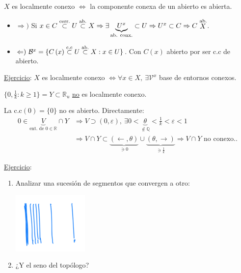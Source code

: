 \begin{prop}
$X$ es localmente conexo $\Leftrightarrow$ la componente conexa de un abierto es abierta.
\end{prop}
\begin{demo}
\begin{itemize}
    \item $\Rightarrow)$ Si $x \in C \stackrel{\text{cerr.}}{\subset} U \stackrel{\text{ab.}}{\subset} X \Rightarrow \exists \underbrace{U^x}_{\text{ab. conx.}} \subset U \Rightarrow U^x \subset C \Rightarrow C \stackrel{\text{ab.}}{X}$.
    \item $\Leftarrow)\ \mathcal{B}^x = \{C\left( x \right) \stackrel{\text{c.c}}{\subset} U \stackrel{\text{ab.}}{\subset} X : x \in U\}$. Con $C\left( x \right)$ abierto por ser c.c de abierto.
\end{itemize}
\end{demo}

\underline{Ejercicio}: $X$ es localmente conexo $\Leftrightarrow \forall x \in X,\ \exists \mathcal{V}^x$ base de entornos conexos.

\begin{ej}[Esencial]
$\{0, \frac{1}{k} : k \ge 1\} = Y \subset \mathbb{R}_u$ \underline{no} es localmente conexo. 
\begin{demo}
    La $\text{c.c}\left( 0 \right) = \{0\}$ no es abierto. Directamente:
    \begin{align*}
        0 \in \underbrace{V}_{\text{ent. de } 0 \in \mathbb{R}} \cap Y &\Rightarrow V \supset \left( 0, \varepsilon \right),\ \exists 0 < \underbrace{\theta}_{\not\in \mathbb{Q}} < \frac{1}{k} < \varepsilon < 1\\
        &\Rightarrow V\cap Y \subset \underbrace{\left( \leftarrow, \theta \right)}_{\ni 0} \cup \underbrace{\left( \theta, \rightarrow \right)}_{\ni \frac{1}{k}}  \Rightarrow V \cap Y \text{ no conexo.} 
    .\end{align*}
\end{demo}
\end{ej}

\underline{Ejercicio}:
\begin{enumerate}
    \item Analizar una sucesión de segmentos que convergen a otro:
    \begin{center}
        \includegraphics[scale=0.3]{images/suc_conv_otro} 
    \end{center}
    \item ¿Y el seno del topólogo?
\end{enumerate}

